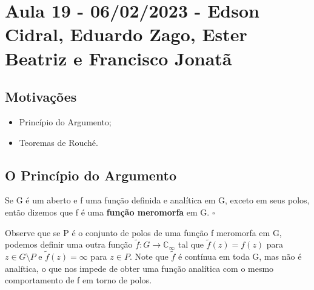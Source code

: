 \documentclass[ComplexAnalysis/complex.tex]{subfiles}
\begin{document}
\section{Aula 19 - 06/02/2023 - Edson Cidral, Eduardo Zago, Ester Beatriz e Francisco Jonatã}
\subsection{Motivações}
\begin{itemize}
	\item Princípio do Argumento;
	\item Teoremas de Rouché.
\end{itemize}
\subsection{O Princípio do Argumento}
\begin{def*}
	Se G é um aberto e f uma função definida e analítica em G, exceto em seus polos, então dizemos que f é uma \textbf{função meromorfa} em G. \(\square\)
\end{def*}
Observe que se P é o conjunto de polos de uma função f meromorfa em G, podemos definir uma outra função \(\tilde{f}:G\rightarrow \mathbb{C}_{\infty}\) tal que
\(\tilde{f}(z) = f(z)\) para \(z\in G\setminus{P}\) e \(\tilde{f}(z) = \infty\) para \(z\in P\). Note que \(\tilde{f}\) é contínua em toda G, mas não é analítica,
o que nos impede de obter uma função analítica com o mesmo comportamento de f em torno de polos.
\end{document}
